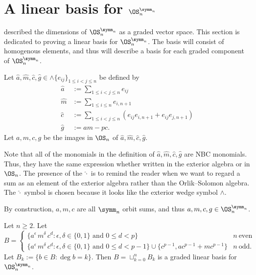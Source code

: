 \documentclass{amsart}
\begin{document}
\section{A linear basis for $\OS_n^{\symm_n}$}\label{sec:LinearBasis}

 described the dimensions of $\OS_n^{\symm_n}$ as a graded vector space.
This section is dedicated to proving a linear basis for $\OS_n^{\symm_n}$.
The basis will consist of homogenous elements, and thus will describe a basis for each graded component of $\OS_n^{\symm_n}$.

\begin{definition}\label{def:BasisElements}
    Let $\hat a, \hat m, \hat c, \hat g \in \wedge \{e_{ij}\}_{1 \leq i < j \leq n}$ be defined by
    \begin{align*}
        \hat a &:= \sum_{1 \leq i < j \leq n} e_{ij}\\
        \hat m &:= \sum_{1 \leq i  \leq n} e_{i,n+1}\\
        \hat c &:= \sum_{1 \leq i < j \leq n} \left( e_{ij}e_{i,n+1} + e_{ij}e_{j,n+1}\right)\\
        \hat g &:= am - pc.
    \end{align*}
    Let $a,m,c,g$ be the images in $\OS_n$ of $\hat a, \hat m, \hat c, \hat g$.
\end{definition}

\begin{remark}
    Note that all of the monomials in the definition of $\hat a, \hat m, \hat c, \hat g$ are NBC monomials. 
    Thus, they have the same expression whether written in the exterior algebra or in $\OS_n$.
    The presence of the $\hat {\cdot}$ is to remind the reader when we want to regard a sum as an element of the exterior algebra rather than the Orlik--Solomon algebra.
    The $\hat{\cdot}$ symbol is chosen because it looks like the exterior wedge symbol $\wedge$.
\end{remark}
\begin{remark}
    By construction, $a,m,c$ are all $\symm_n$ orbit sums, and thus $a,m,c,g \in \OS_n^{\symm_n}$.
\end{remark}

\begin{proposition}\label{prop:LinearBasisC}
    Let $n \geq 2$. Let
        \[
    B = \begin{cases}
    \{a^\epsilon\, m^\delta\, c^d : \epsilon, \delta \in \{0,1\} \text{ and } 0 \leq d < p \} & n~\text{even} \\
    \{a^\epsilon\, m^\delta\, c^d : \epsilon, \delta \in \{0,1\} \text{ and } 0 \leq d < p -1 \} \cup \{c^{p-1}, ac^{p-1} + mc^{p-1}\} & n~\text{odd}.
    \end{cases}
    \]
    Let $B_k := \{b \in B : \deg b = k\}$.
    Then
    $B = \sqcup_{k=0}^n B_k$ is a graded linear basis for $\OS_n^{\symm_n}$.
\end{proposition}
\end{document}
